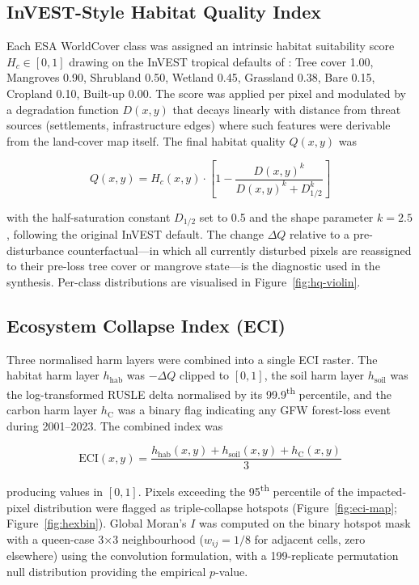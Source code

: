 \documentclass[12pt,a4paper]{article}
\begin{document}
\subsection{InVEST-Style Habitat Quality Index}
\label{sec:methods-habitat}

Each ESA WorldCover class was assigned an intrinsic habitat
suitability score $H_c \in [0,1]$ drawing on the InVEST tropical
defaults of \citet{sharp2020}: Tree cover 1.00, Mangroves 0.90,
Shrubland 0.50, Wetland 0.45, Grassland 0.38, Bare 0.15, Cropland
0.10, Built-up 0.00. The score was applied per pixel and modulated by
a degradation function $D(x,y)$ that decays linearly with distance
from threat sources (settlements, infrastructure edges) where such
features were derivable from the land-cover map itself. The final
habitat quality $Q(x,y)$ was

\[
Q(x,y) = H_c(x,y) \cdot \left[1 - \frac{D(x,y)^k}{D(x,y)^k + D_{1/2}^k}\right]
\]

with the half-saturation constant $D_{1/2}$ set to 0.5 and the shape
parameter $k=2.5$, following the original InVEST default. The change
$\Delta Q$ relative to a pre-disturbance counterfactual---in which
all currently disturbed pixels are reassigned to their pre-loss tree
cover or mangrove state---is the diagnostic used in the synthesis.
Per-class distributions are visualised in
Figure~\ref{fig:hq-violin}.

\subsection{Ecosystem Collapse Index (ECI)}
\label{sec:methods-eci}

Three normalised harm layers were combined into a single ECI raster.
The habitat harm layer $h_{\text{hab}}$ was $-\Delta Q$ clipped to
$[0,1]$, the soil harm layer $h_{\text{soil}}$ was the log-transformed
RUSLE delta normalised by its 99.9\textsuperscript{th} percentile,
and the carbon harm layer $h_{\text{C}}$ was a binary flag indicating
any GFW forest-loss event during 2001--2023. The combined index was

\[
\text{ECI}(x,y) = \frac{h_{\text{hab}}(x,y) + h_{\text{soil}}(x,y)
                       + h_{\text{C}}(x,y)}{3}
\]

producing values in $[0,1]$. Pixels exceeding the
95\textsuperscript{th} percentile of the impacted-pixel distribution
were flagged as triple-collapse hotspots (Figure~\ref{fig:eci-map};
Figure~\ref{fig:hexbin}). Global Moran's $I$ was computed on the
binary hotspot mask with a queen-case 3$\times$3 neighbourhood
($w_{ij}=1/8$ for adjacent cells, zero elsewhere) using the
convolution formulation, with a 199-replicate permutation null
distribution providing the empirical $p$-value.
\end{document}
